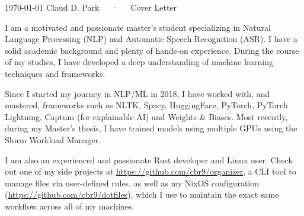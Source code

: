 \documentclass[11pt, a4paper]{awesome-cv}
\begin{document}
\makecvheader[R]

\makecvfooter
  {\today}
  {Claud D. Park~~~·~~~Cover Letter}
  {}

\makelettertitle

\begin{cvletter}

I am a motivated and passionate master's student specializing in Natural Language Processing (NLP) and Automatic Speech Recognition (ASR). I have a solid academic background and plenty of hands-on experience. During the course of my studies, I have developed a deep understanding of machine learning techniques and frameworks. 

Since I started my journey in NLP/ML in 2018, I have worked with, and mastered, frameworks such as NLTK, Spacy, HuggingFace, PyTorch, PyTorch Lightning, Captum (for explainable AI) and Weights \& Biases. Most recently, during my Master's thesis, I have trained models using multiple GPUs using the Slurm Workload Manager.

I am also an experienced and passionate Rust developer and Linux user. Check out one of my side projects at \url{https://github.com/cbr9/organizer}, a CLI tool to manage files via user-defined rules, as well as my NixOS configuration (\url{https://github.com/cbr9/dotfiles}), which I use to maintain the exact same workflow across all of my machines.



\end{cvletter}
\end{document}
